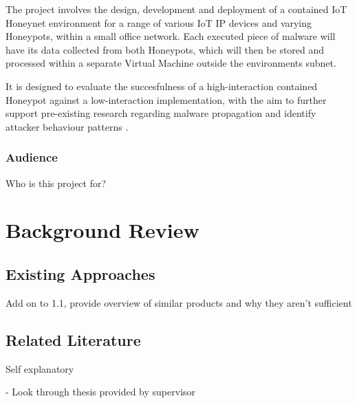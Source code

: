 \documentclass[a4paper,12pt,oneside]{book}			%
\begin{document}
The project involves the design, development and deployment of a contained IoT Honeynet environment for a range of various IoT IP devices and varying Honeypots, within a small office network. Each executed piece of malware will have its data collected from both Honeypots, which will then be stored and processed within a separate Virtual Machine outside the environments subnet. 

It is designed to evaluate the succesfulness of a high-interaction contained Honeypot against a low-interaction implementation, with the aim to further support pre-existing research regarding malware propagation and identify attacker behaviour patterns  \textit{\citep{Kocaogullar2023honeypots}}.


\subsection{Audience}\label{sec:audience}

Who is this project for?

\chapter{Background Review}\label{ch:backgroundReview}

\section{Existing Approaches}\label{sec:existingApproaches}

Add on to 1.1, provide overview of similar products and why they aren't sufficient

\section{Related Literature}\label{sec:relatedLiterature}

Self explanatory

- Look through thesis provided by supervisor
\end{document}
